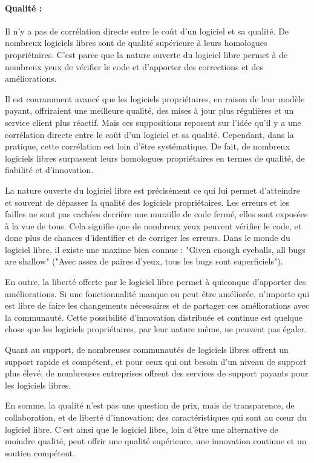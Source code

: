 \paragraph{Qualité :} Il n'y a pas de corrélation directe entre le coût d'un logiciel et sa qualité. De nombreux logiciels libres sont de qualité supérieure à leurs homologues propriétaires. C'est parce que la nature ouverte du logiciel libre permet à de nombreux yeux de vérifier le code et d'apporter des corrections et des améliorations.

Il est couramment avancé que les logiciels propriétaires, en raison de leur modèle payant, offriraient une meilleure qualité, des mises à jour plus régulières et un service client plus réactif. Mais ces suppositions reposent sur l'idée qu'il y a une corrélation directe entre le coût d'un logiciel et sa qualité. Cependant, dans la pratique, cette corrélation est loin d'être systématique. De fait, de nombreux logiciels libres surpassent leurs homologues propriétaires en termes de qualité, de fiabilité et d'innovation.

La nature ouverte du logiciel libre est précisément ce qui lui permet d'atteindre et souvent de dépasser la qualité des logiciels propriétaires. Les erreurs et les failles ne sont pas cachées derrière une muraille de code fermé, elles sont exposées à la vue de tous. Cela signifie que de nombreux yeux peuvent vérifier le code, et donc plus de chances d'identifier et de corriger les erreurs. Dans le monde du logiciel libre, il existe une maxime bien connue : "Given enough eyeballs, all bugs are shallow" ("Avec assez de paires d'yeux, tous les bugs sont superficiels").

En outre, la liberté offerte par le logiciel libre permet à quiconque d'apporter des améliorations. Si une fonctionnalité manque ou peut être améliorée, n'importe qui est libre de faire les changements nécessaires et de partager ces améliorations avec la communauté. Cette possibilité d'innovation distribuée et continue est quelque chose que les logiciels propriétaires, par leur nature même, ne peuvent pas égaler.

Quant au support, de nombreuses communautés de logiciels libres offrent un support rapide et compétent, et pour ceux qui ont besoin d'un niveau de support plus élevé, de nombreuses entreprises offrent des services de support payants pour les logiciels libres.

En somme, la qualité n'est pas une question de prix, mais de transparence, de collaboration, et de liberté d'innovation; des caractéristiques qui sont au cœur du logiciel libre. C'est ainsi que le logiciel libre, loin d'être une alternative de moindre qualité, peut offrir une qualité supérieure, une innovation continue et un soutien compétent.


